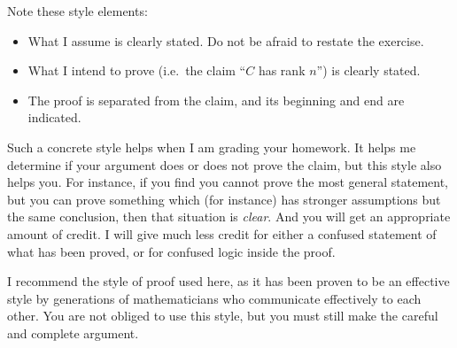 \documentclass[12pt]{amsart}
\begin{document}
\noindent Note these style elements:
\begin{itemize}
\item What I assume is clearly stated.  Do not be afraid to restate the exercise.
\item What I intend to prove (i.e.~the claim ``$C$ has rank $n$'') is clearly stated.
\item The proof is separated from the claim, and its beginning and end are indicated.
\end{itemize}
\medskip

Such a concrete style helps when I am grading your homework.  It helps me determine if your argument does or does not prove the claim, but this style also helps you.  For instance, if you find you cannot prove the most general statement, but you can prove something which (for instance) has stronger assumptions but the same conclusion, then that situation is \emph{clear}.  And you will get an appropriate amount of credit.  I will give much less credit for either a confused statement of what has been proved, or for confused logic inside the proof.
\medskip

I recommend the style of proof used here, as it has been proven to be an effective style by generations of mathematicians who communicate effectively to each other.  You are not obliged to use this style, but you must still make the careful and complete argument.
\end{document}
